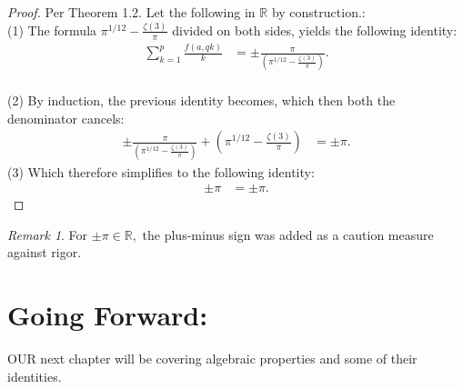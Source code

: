 \documentclass[10pt]{article}
\theoremstyle{plain}
\theoremstyle{definition}
\theoremstyle{remark}
\newtheorem{remark}[theorem]{Remark}
\begin{document}
\begin{proof}
Per Theorem 1.2. Let the following in $\mathbb{R}$ by construction.:\\(1) The formula $\pi^{1/12} - \frac{\zeta(3)}{\pi}$ divided on both sides, yields the following identity:
\begin{align*}
	\sum_{k=1}^{p} \frac{f(a, qk)}{k}  &= \pm \frac{\pi}{(\pi^{1/12} - \frac{\zeta(3)}{\pi})}.
\end{align*}\\
(2) By induction, the previous identity becomes, which then both the denominator cancels:
\begin{align*}
	\pm \frac{\pi}{(\pi^{1/12} - \frac{\zeta(3)}{\pi})} + (\pi^{1/12} - \frac{\zeta(3)}{\pi}) &= \pm \pi.
\end{align*}
(3) Which therefore simplifies to the following identity:
\begin{align*}
	\pm \pi &= \pm \pi.
\end{align*}
\end{proof}
\begin{remark}
For $\pm \pi \in \mathbb{R},$ the plus-minus sign was added as a caution measure against rigor.
\end{remark}

\section{Going Forward:}

\lettrine[lines=1, lhang=0.1, loversize=0.2]{O}UR next chapter will be covering algebraic properties and some of their identities.

\nocite{*}




\end{document}
